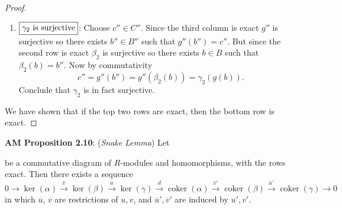 \documentclass[8pt]{amsart}
\theoremstyle{plain}%
\theoremstyle{definition}
\theoremstyle{remark}
\numberwithin{equation}{section}
\newcommand{\coker}{\operatorname{coker}}
\begin{document}
\begin{proof}
\begin{enumerate}
			\item $\boxed{\gamma_2$ is surjective$}$: Choose $c'' \in C''$. Since the third column is exact $g''$ is surjective so there exists $b'' \in B''$ such that $g''(b'') = c''$. But since the second row is exact $\beta_2$ is surjective so there exists $b \in B$ such that $\beta_2(b) = b''$. Now by commutativity $$c'' = g''(b'') = g''(\beta_2(b)) = \gamma_2(g(b)).$$ Conclude that $\gamma_2$ is in fact surjective.
		\end{enumerate}
		We have shown that if the top two rows are exact, then the bottom row is exact.
	\end{proof}






\textbf{AM Proposition 2.10}: (\textit{Snake Lemma}) Let

	\begin{center}
	\end{center}

be a commutative diagram of $R$-modules and homomorphisms, with the rows exact. Then there exists a sequence $$0 \rightarrow \ker(\alpha) \xrightarrow{\overline v} \ker(\beta) \xrightarrow{\overline u} \ker (\gamma) \xrightarrow d \coker(\alpha) \xrightarrow {\overline v'} \coker (\beta) \xrightarrow{\overline u'} \coker(\gamma) \rightarrow 0$$ in which $\overline u$, $\overline v$ are restrictions of $u, v$, and $\overline u', \overline v'$ are induced by $u', v'$.\\
\end{document}
